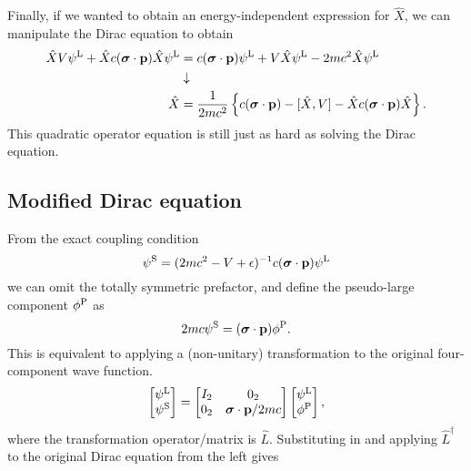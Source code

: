 \documentclass{article}
\begin{document}
Finally, if we wanted to obtain an energy-independent expression for $\hat{ X }$, we can manipulate the Dirac equation to obtain
\begin{align}
\hat{ X }V\psi^{\mathrm{L}}+\hat{ X }c(\bm{\mathrm{\sigma}}\cdot\bm{\mathrm{p}})\hat{ X }\psi^{\mathrm{L}}&=c(\bm{\mathrm{\sigma}}\cdot\bm{\mathrm{p}})\psi^{\mathrm{L}}+V\hat{ X }\psi^{\mathrm{L}}-2mc^2\hat{ X }\psi^{\mathrm{L}}\\
    &\downarrow\nonumber\\
    \hat{ X }&=\frac{1}{2mc^2}\left\{ c(\bm{\mathrm{\sigma}}\cdot\bm{\mathrm{p}}) -[\hat{ X },V]-\hat{ X }c(\bm{\mathrm{\sigma}}\cdot\bm{\mathrm{p}})\hat{ X } \right\}.
\end{align}
This quadratic operator equation is still just as hard as solving the Dirac equation.

\subsection{Modified Dirac equation}
From the exact coupling condition 
\begin{equation}
    \psi^{\mathrm{S}}=(2mc^2-V+\epsilon)^{-1}c(\bm{\mathrm{\sigma}}\cdot\bm{\mathrm{p}})\psi^{\mathrm{L}}
\end{equation}
we can omit the totally symmetric prefactor, and define the pseudo-large component $\phi^{\mathrm{P}}$ as
\begin{equation}
    2mc\psi^{\mathrm{S}}=(\bm{\mathrm{\sigma}}\cdot\bm{\mathrm{p}})\phi^{\mathrm{P}}.
\end{equation}
This is equivalent to applying a (non-unitary) transformation to the original four-component wave function.
\begin{equation}
    \begin{bmatrix}
        \psi^{\mathrm{L}} \\ \psi^{\mathrm{S}}
    \end{bmatrix}
    =
    \begin{bmatrix}
        I_2 & 0_2 \\
        0_2 & \bm{\mathrm{\sigma}}\cdot\bm{\mathrm{p}}/2mc
    \end{bmatrix}
    \begin{bmatrix}
        \psi^{\mathrm{L}} \\
        \phi^{\mathrm{P}}
    \end{bmatrix},
\end{equation}
where the transformation operator/matrix is $\hat{L}$. Substituting in and applying $\hat{L}^{\dagger}$ to the original Dirac equation from the left gives
\end{document}
